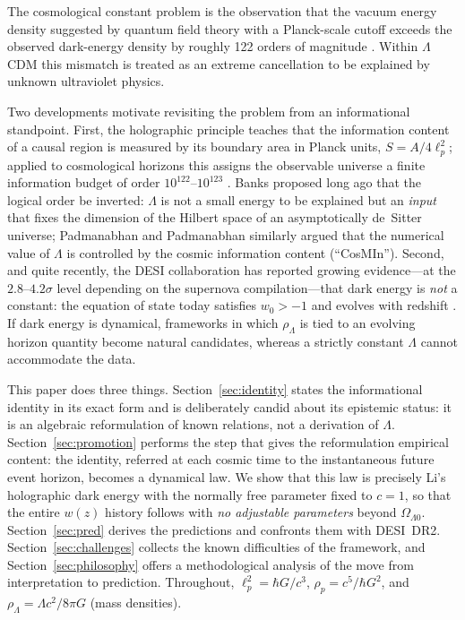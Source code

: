 \documentclass[11pt,a4paper]{article}
\begin{document}
The cosmological constant problem is the observation that the vacuum energy
density suggested by quantum field theory with a Planck-scale cutoff exceeds
the observed dark-energy density by roughly 122 orders of magnitude
\citep{Weinberg1989,Martin2012}. Within $\Lambda$CDM this mismatch is treated
as an extreme cancellation to be explained by unknown ultraviolet physics.

Two developments motivate revisiting the problem from an informational
standpoint. First, the holographic principle
\citep{Bekenstein1973,Hawking1975,tHooft1993,Susskind1995} teaches that the
information content of a causal region is measured by its boundary area in
Planck units, $S = A/4\ell_p^2$; applied to cosmological horizons this
assigns the observable universe a finite information budget of order
$10^{122}$--$10^{123}$ \citep{Lloyd2002,EganLineweaver2010}. Banks
\citep{Banks2000} proposed long ago that the logical order be inverted:
$\Lambda$ is not a small energy to be explained but an \emph{input} that
fixes the dimension of the Hilbert space of an asymptotically de~Sitter
universe; Padmanabhan and Padmanabhan \citep{CosMIn2013,Padmanabhan2012}
similarly argued that the numerical value of $\Lambda$ is controlled by the
cosmic information content (``CosMIn''). Second, and quite recently, the DESI
collaboration has reported growing evidence---at the $2.8$--$4.2\sigma$ level
depending on the supernova compilation---that dark energy is \emph{not} a
constant: the equation of state today satisfies $w_0 > -1$ and evolves with
redshift \citep{DESIDR1,DESIDR2,DESIDR2ext}. If dark energy is dynamical,
frameworks in which $\rho_\Lambda$ is tied to an evolving horizon quantity
become natural candidates, whereas a strictly constant $\Lambda$ cannot
accommodate the data.

This paper does three things. Section~\ref{sec:identity} states the
informational identity in its exact form and is deliberately candid about its
epistemic status: it is an algebraic reformulation of known relations, not a
derivation of $\Lambda$. Section~\ref{sec:promotion} performs the step that
gives the reformulation empirical content: the identity, referred at each
cosmic time to the instantaneous future event horizon, becomes a dynamical
law. We show that this law is precisely Li's holographic dark energy
\citep{CKN1999,Li2004,WangReview2017} with the normally free parameter fixed
to $c=1$, so that the entire $w(z)$ history follows with \emph{no adjustable
parameters} beyond $\Omega_{\Lambda 0}$. Section~\ref{sec:pred} derives the
predictions and confronts them with DESI~DR2. Section~\ref{sec:challenges}
collects the known difficulties of the framework, and
Section~\ref{sec:philosophy} offers a methodological analysis of the move
from interpretation to prediction. Throughout, $\ell_p^2=\hbar G/c^3$,
$\rho_p = c^5/\hbar G^2$, and $\rho_\Lambda = \Lambda c^2/8\pi G$ (mass
densities).
\end{document}
